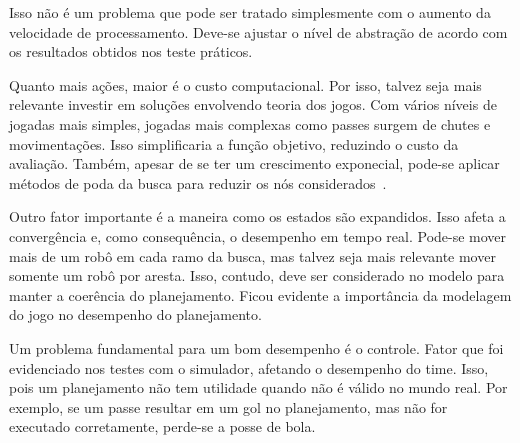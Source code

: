 Isso não é um problema que pode ser tratado simplesmente com o aumento
da velocidade de processamento. Deve-se ajustar o nível de abstração de acordo
com os resultados obtidos nos teste práticos.

Quanto mais ações, maior é o custo computacional. Por isso, talvez seja
mais relevante investir em soluções envolvendo teoria dos jogos. Com
vários níveis de jogadas mais simples, jogadas mais complexas como passes
surgem de chutes e movimentações. Isso simplificaria a função objetivo,
reduzindo o custo da avaliação. Também, apesar de se ter um crescimento
exponecial, pode-se aplicar métodos de poda da busca para reduzir os
nós considerados~\cite{russell2003artificial}.

Outro fator importante é a maneira como os estados são
expandidos. Isso afeta a convergência e, como consequência, o desempenho
em tempo real. Pode-se mover mais de um robô em cada ramo da busca, mas
talvez seja mais relevante mover somente um robô por aresta. Isso, contudo,
deve ser considerado no modelo para manter a coerência do planejamento.
Ficou evidente a importância da modelagem do jogo no desempenho do planejamento.

Um problema fundamental para um bom desempenho é o controle.
Fator que foi evidenciado nos testes com o simulador, afetando
o desempenho do time. Isso, pois um planejamento não tem utilidade
quando não é válido no mundo real. Por exemplo, se um passe resultar
em um gol no planejamento, mas não for executado corretamente,
perde-se a posse de bola. 
